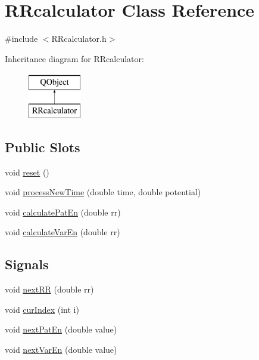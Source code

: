 \hypertarget{class_r_rcalculator}{\section{R\+Rcalculator Class Reference}
\label{class_r_rcalculator}
}


{\ttfamily \#include $<$R\+Rcalculator.\+h$>$}

Inheritance diagram for R\+Rcalculator\+:\begin{figure}[H]
\begin{center}
\leavevmode
\includegraphics[height=2.000000cm]{class_r_rcalculator}
\end{center}
\end{figure}
\subsection*{Public Slots}
\begin{DoxyCompactItemize}
\item 
void \hyperlink{class_r_rcalculator_affa5d0f172be4d9aa0601c8f1824aba7}{reset} ()
\item 
void \hyperlink{class_r_rcalculator_a06b4c617afcb01dc74c6c542ede4af05}{process\+New\+Time} (double time, double potential)
\item 
void \hyperlink{class_r_rcalculator_a91d3f4c5a7a4ca1f749a9ecada0b7d5c}{calculate\+Pat\+En} (double rr)
\item 
void \hyperlink{class_r_rcalculator_ac55486650721726e4193bdc77b2f6bbe}{calculate\+Var\+En} (double rr)
\end{DoxyCompactItemize}
\subsection*{Signals}
\begin{DoxyCompactItemize}
\item 
void \hyperlink{class_r_rcalculator_aa8fa57e1512d3883d321a2d8a85151c3}{next\+R\+R} (double rr)
\item 
void \hyperlink{class_r_rcalculator_aa0c89346708b0ec0b64b4256a0120c1f}{cur\+Index} (int i)
\item 
void \hyperlink{class_r_rcalculator_a43e47f2cb76a4463da74deacabbafb12}{next\+Pat\+En} (double value)
\item 
void \hyperlink{class_r_rcalculator_a95e6ec7b23c518a8e381e3c0ae65b628}{next\+Var\+En} (double value)
\end{DoxyCompactItemize}
